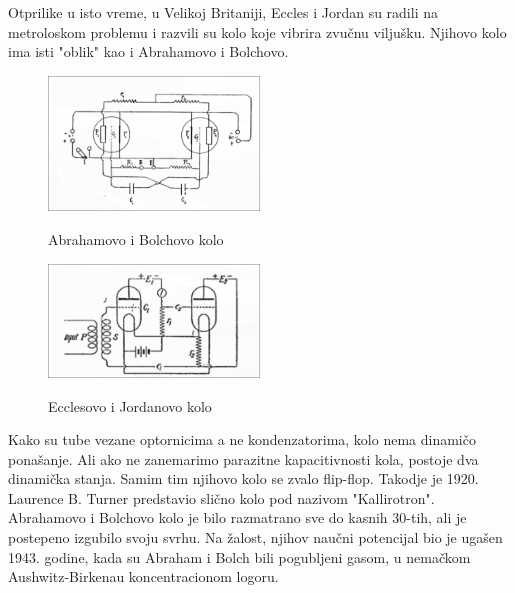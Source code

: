 \documentclass[12pt,a4paper]{article}
\begin{document}
Otprilike u isto vreme, u Velikoj Britaniji, Eccles i Jordan su radili na metroloskom problemu i razvili su kolo koje vibrira zvučnu viljušku. 
Njihovo kolo ima isti "oblik" kao i Abrahamovo i Bolchovo.\newline
\begin{figure}[hb]
  \centering
  \includegraphics[width=0.5\textwidth]{AB.png}
  \caption{Abrahamovo i Bolchovo kolo}\cite{wVib}
\end{figure}
\begin{figure}[ht]
  \centering
  \includegraphics[width=0.5\textwidth]{EJ.png}
  \caption{Ecclesovo i Jordanovo kolo}\cite{wVib}
\end{figure}

Kako su tube vezane optornicima a ne kondenzatorima, kolo nema dinamičo ponašanje. 
Ali ako ne zanemarimo parazitne kapacitivnosti kola, postoje dva dinamička stanja.\cite{wVib}
Samim tim njihovo kolo se zvalo flip-flop. Takodje je 1920. Laurence B. Turner predstavio slično kolo pod nazivom "Kallirotron".
Abrahamovo i Bolchovo kolo je bilo razmatrano sve do kasnih 30-tih, ali je postepeno izgubilo svoju svrhu.\newline
Na žalost, njihov naučni potencijal bio je ugašen 1943. godine, kada su Abraham i Bolch bili pogubljeni gasom, u nemačkom Aushwitz-Birkenau koncentracionom logoru.\newline 
\end{document}
